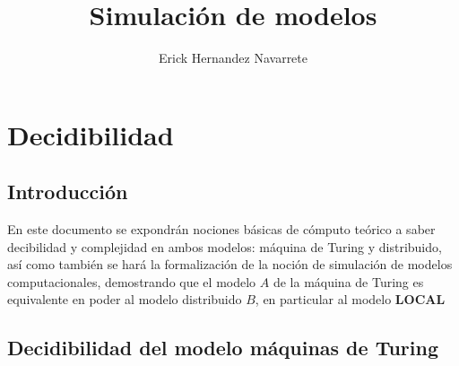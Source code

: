 \documentclass[10pt]{report}
\author{Erick Hernandez Navarrete}
\title{Simulación de modelos}
\begin{document}

    \maketitle
    \tableofcontents{}
    \chapter{Decidibilidad}\label{ch:decidibilidad-en-los-modelos}
    \section{Introducción}\label{sec:introducción}
    En este documento se expondrán nociones básicas de cómputo teórico a saber decibilidad y complejidad en ambos modelos:
    máquina de Turing y distribuido,
    así como también se hará la formalización de la noción de simulación de modelos
    computacionales, demostrando que el modelo $A$ de  la máquina de
    Turing es equivalente en poder al modelo distribuido $B$, en particular al modelo \textbf{LOCAL}

    \section{Decidibilidad del modelo máquinas de Turing}\label{sec:decidibilidasd-en-el-modelo-de-máquinas-de-Turing}
\end{document}
